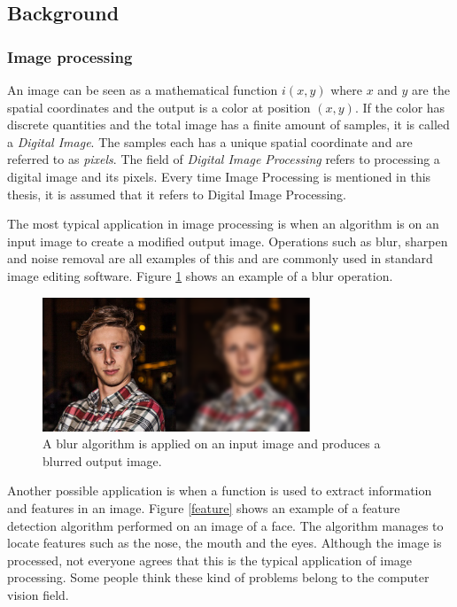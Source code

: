 \subsection{Background}
\subsubsection{Image processing}
An image can be seen as a mathematical function $i(x,y)$ where $x$ and $y$ are the spatial coordinates and the output is a color at position $(x,y)$. If the color has discrete quantities and the total image has a finite amount of samples, it is called a \emph{Digital Image}. The samples each has a unique spatial coordinate and are referred to as \emph{pixels}. The field of \emph{Digital Image Processing} refers to processing a digital image and its pixels. Every time Image Processing is mentioned in this thesis, it is assumed that it refers to Digital Image Processing. 
\newline

The most typical application in image processing is when an algorithm is on an input image to create a modified output image. Operations such as blur, sharpen and noise removal are all examples of this and are commonly used in standard image editing software. Figure \ref{lena} shows an example of a blur operation.
\begin{figure}[ht!]
\centering
\includegraphics[width=80mm]{img/klas.png}
\caption{A blur algorithm is applied on an input image and produces a blurred output image.}
\label{lena}
\end{figure}

Another possible application is when a function is used to extract information and features in an image. Figure \ref{feature} shows an example of a feature detection algorithm performed on an image of a face. The algorithm manages to locate features such as the nose, the mouth and the eyes. Although the image is processed, not everyone agrees that this is the typical application of image processing. Some people think these kind of problems belong to the computer vision field. 

